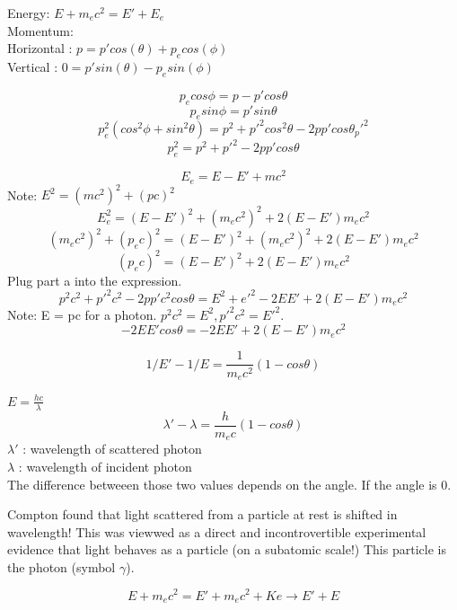 \documentclass[class=article,crop=false]{standalone}
\begin{document}
\begin{question}
	Energy: $ E + m_ec^2 = E' + E_e $ \\
	Momentum: \\
	Horizontal : $ p = p' cos(\theta) + p_e cos(\phi) $ \\
	Vertical : $ 0 = p' sin(\theta) - p_e sin(\phi) $ \\
	\begin{answer}
		$$ p_e cos\phi = p - p'cos\theta $$	
		$$ p_e sin\phi = p'sin\theta $$	
		$$ p_e^2(cos^2\phi+sin^2\theta) = p^2 + p'^2cos^2\theta - 2pp'cos\theta _ p'^2 $$
		$$ p_e^2 = p^2 + p'^2 - 2pp'cos\theta $$
	\end{answer}

	\begin{answer}[Eliminate $E_e$]
		$$ E_e = E - E' + mc^2 $$
		Note: $ E^2 = (mc^2)^2 + (pc)^2 $ \\
		$$ E_e^2 = (E-E')^2 + (m_ec^2)^2 + 2(E-E')m_ec^2 $$
		$$ (m_ec^2)^2 + (p_ec)^2 = (E-E')^2 + (m_ec^2)^2 + 2(E - E')m_ec^2 $$
		$$ (p_ec)^2 = (E-E')^2 + 2(E - E')m_ec^2 $$
		Plug part a into the expression.
		$$ p^2c^2 + p'^2c^2-2pp'c^2cos\theta = E^2+e'^2-2EE'+2(E-E')m_ec^2 $$
		Note: E = pc for a photon. $p^2c^2 = E^2, p'^2c^2 = E'^2$.
		$$ -2EE' cos\theta = -2EE' + 2(E-E')m_ec^2 $$
		\begin{result}
			$$ 1/E' - 1/E = \frac{1}{m_ec^2}(1-cos\theta) $$
		\end{result}
		\begin{result}[Wavelength]
			$E = \frac{hc}{\lambda}$
			$$ \lambda' - \lambda = \frac{h}{m_ec}(1-cos\theta) $$
			$\lambda '$ : wavelength of scattered photon\\
			$\lambda $ : wavelength of incident photon\\
			The difference betweeen those two values depends on the angle. If the angle is 0. 
		\end{result}
	\end{answer}
\end{question}

Compton found that light scattered from a particle at rest is shifted in wavelength! This was viewwed as a direct and incontrovertible experimental evidence that light behaves as a particle (on a subatomic scale!) This particle is the photon (symbol $\gamma$).

\begin{answer}
	$$ E + m_ec^2 = E' + m_ec^2 + Ke \rightarrow E' + E $$
\end{answer}
\end{document}
